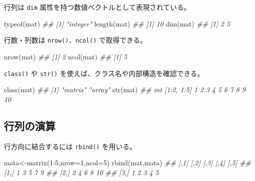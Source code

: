 \documentclass[
  letterpaper,
  xelatex,
  ja=standard, xelatex]{bxjsbook}
\newenvironment{Shaded}{\begin{snugshade}}{\end{snugshade}}
\newcommand{\AttributeTok}[1]{\textcolor[rgb]{0.40,0.45,0.13}{#1}}
\newcommand{\DecValTok}[1]{\textcolor[rgb]{0.68,0.00,0.00}{#1}}
\newcommand{\DocumentationTok}[1]{\textcolor[rgb]{0.37,0.37,0.37}{\textit{#1}}}
\newcommand{\FunctionTok}[1]{\textcolor[rgb]{0.28,0.35,0.67}{#1}}
\newcommand{\NormalTok}[1]{\textcolor[rgb]{0.00,0.23,0.31}{#1}}
\newcommand{\OtherTok}[1]{\textcolor[rgb]{0.00,0.23,0.31}{#1}}
\newcommand{\SpecialCharTok}[1]{\textcolor[rgb]{0.37,0.37,0.37}{#1}}
\begin{document}
行列は \texttt{dim} 属性を持つ数値ベクトルとして表現されている。

\begin{Shaded}
\begin{Highlighting}[]
\FunctionTok{typeof}\NormalTok{(mat)}
\DocumentationTok{\#\# [1] "integer"}
\FunctionTok{length}\NormalTok{(mat)}
\DocumentationTok{\#\# [1] 10}
\FunctionTok{dim}\NormalTok{(mat)}
\DocumentationTok{\#\# [1] 2 5}
\end{Highlighting}
\end{Shaded}

行数・列数は \texttt{nrow()}、\texttt{ncol()} で取得できる。

\begin{Shaded}
\begin{Highlighting}[]
\FunctionTok{nrow}\NormalTok{(mat)}
\DocumentationTok{\#\# [1] 2}
\FunctionTok{ncol}\NormalTok{(mat)}
\DocumentationTok{\#\# [1] 5}
\end{Highlighting}
\end{Shaded}

\texttt{class()} や \texttt{str()}
を使えば、クラス名や内部構造を確認できる。

\begin{Shaded}
\begin{Highlighting}[]
\FunctionTok{class}\NormalTok{(mat)}
\DocumentationTok{\#\# [1] "matrix" "array"}
\FunctionTok{str}\NormalTok{(mat)}
\DocumentationTok{\#\#  int [1:2, 1:5] 1 2 3 4 5 6 7 8 9 10}
\end{Highlighting}
\end{Shaded}

\subsection{行列の演算}\label{ux884cux5217ux306eux6f14ux7b97}

行方向に結合するには \texttt{rbind()} を用いる。

\begin{Shaded}
\begin{Highlighting}[]
\NormalTok{mata}\OtherTok{\textless{}{-}}\FunctionTok{matrix}\NormalTok{(}\DecValTok{1}\SpecialCharTok{:}\DecValTok{5}\NormalTok{,}\AttributeTok{nrow=}\DecValTok{1}\NormalTok{,}\AttributeTok{ncol=}\DecValTok{5}\NormalTok{)}
\FunctionTok{rbind}\NormalTok{(mat,mata)}
\DocumentationTok{\#\#      [,1] [,2] [,3] [,4] [,5]}
\DocumentationTok{\#\# [1,]    1    3    5    7    9}
\DocumentationTok{\#\# [2,]    2    4    6    8   10}
\DocumentationTok{\#\# [3,]    1    2    3    4    5}
\end{Highlighting}
\end{Shaded}
\end{document}

